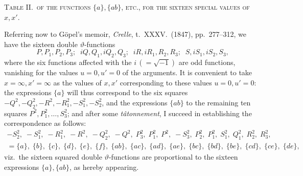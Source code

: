 \documentclass[11pt,a4paper]{article}
\begin{document}
\newpage


\begin{center}
\textsc{Table II.\ of the functions $\{a\}, \{ab\}$, etc., for the sixteen special values of $x, x'$.}
\end{center}

\medskip

\noindent [The original printed Table II.\ is a $16 \times 16$ array showing, for each of the sixteen special pairs $x, x' = \infty\infty, ab, ac, ad, ae, af, bc, bd, be, bf, cd, ce, cf, de, df, ef$ (across the top), the corresponding values of the sixteen functions
\[
\{a\}, \{b\}, \{c\}, \{d\}, \{e\}, \{f\},\ \{ab\}, \{ac\}, \{ad\}, \{ae\}, \{bc\}, \{bd\}, \{be\}, \{cd\}, \{ce\}, \{de\}
\]
(down the left side). Each non-zero entry is one of the ten radicals $\pm\sqrt{ab}, \pm\sqrt{ac}, \ldots, \pm\sqrt{de}$ with its proper sign; in many entries the sign of the entire column has been reversed (as compared with the values directly derived from Table I) so as to present the functions in their most convenient form. The full table occupies one printed page; it shows that the sixteen functions $\{a\}, \{ab\}$, take, over the sixteen special pairs $x, x'$, only the ten values $\sqrt{ab}, \sqrt{ac}, \ldots, \sqrt{de}$ each with a proper sign.]

\newpage


\noindent Referring now to G\"opel's memoir, \emph{Crelle}, t.~XXXV.\ (1847), pp.~277--312, we have the sixteen double $\vartheta$-functions
\[
P, P_{1}, P_{2}, P_{3};\;\; iQ, Q_{1}, iQ_{2}, Q_{3};\;\; iR, iR_{1}, R_{2}, R_{3};\;\; S, iS_{1}, iS_{2}, S_{3},
\]
where the six functions affected with the $i\,(=\sqrt{-1})$ are odd functions, vanishing for the values $u = 0, u' = 0$ of the arguments. It is convenient to take $x = \infty, x' = \infty$ as the values of $x, x'$ corresponding to these values $u = 0, u' = 0$: the expressions $\{a\}$ will thus correspond to the six squares $-Q^{2}, -Q_{2}^{2}, -R^{2}, -R_{1}^{2}, -S_{1}^{2}, -S_{2}^{2}$, and the expressions $\{ab\}$ to the remaining ten squares $P^{2}, P_{1}^{2}, \ldots, S_{3}^{2}$; and after some \emph{t\^atonnement}, I succeed in establishing the correspondence as follows:
\[
\begin{array}{c}
-S_{2}^{2},\;-S_{1}^{2},\;-R_{1}^{2},\;-R^{2},\;-Q_{2}^{2},\;-Q^{2},\;P_{3}^{2},\;P_{1}^{2},\;P^{2},\;-S_{3}^{2},\;P_{2}^{2},\;P_{1}^{2},\;S_{1}^{2},\;Q_{1}^{2},\;R_{2}^{2},\;R_{3}^{2},\\[3pt]
= \{a\},\;\{b\},\;\{c\},\;\{d\},\;\{e\},\;\{f\},\;\{ab\},\;\{ac\},\;\{ad\},\;\{ae\},\;\{bc\},\;\{bd\},\;\{be\},\;\{cd\},\;\{ce\},\;\{de\},
\end{array}
\]
viz.\ the sixteen squared double $\vartheta$-functions are proportional to the sixteen expressions $\{a\}, \{ab\}$, as hereby appearing.
\end{document}

